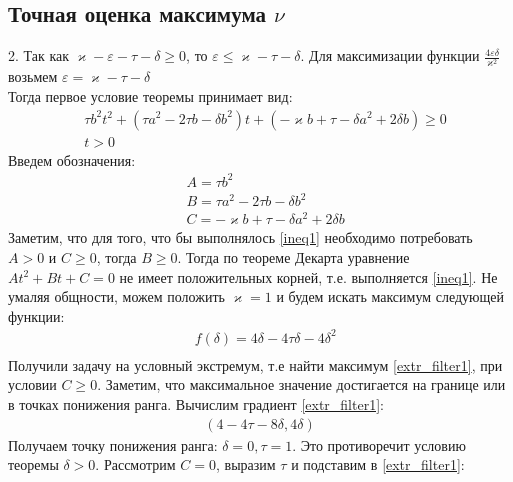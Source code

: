 \documentclass[a4paper]{article}
\begin{document}
\subsection{Точная оценка максимума $\nu$}
2. Так как $\varkappa - \varepsilon - \tau - \delta \geq 0$, то $ \varepsilon \leq \varkappa - \tau - \delta$. Для максимизации функции $\frac{4\varepsilon\delta}{\varkappa^2}$ возьмем $\varepsilon = \varkappa - \tau - \delta$\\
Тогда первое условие теоремы принимает вид:
\begin{equation}\label{ineq1} 
 \begin{aligned}
&\tau b^2t^2 + (\tau a^2-2 \tau b - \delta b^2)t + (-\varkappa b+\tau-\delta a^2 + 2\delta b) \geq 0\\
&t > 0
 \end{aligned}
\end{equation}
Введем обозначения:
\begin{equation}
 \begin{aligned}
&A = \tau b^2\\
&B = \tau a^2-2 \tau b - \delta b^2\\
&C = -\varkappa b+\tau-\delta a^2 + 2\delta b
 \end{aligned}
\end{equation}
Заметим, что для того, что бы выполнялось \eqref{ineq1} необходимо потребовать $A > 0$ и $C \geq 0$, тогда $B \geq 0$. Тогда по теореме Декарта уравнение $At^2 + Bt + C = 0$ не имеет положительных корней, т.е. выполняется \eqref{ineq1}. Не умаляя общности, можем положить $\varkappa = 1$ и будем искать максимум следующей функции: 
\begin{equation}\label{extr_filter1}
 \begin{aligned}
&f(\delta) = 4\delta-4\tau\delta - 4\delta^2\\
 \end{aligned}
\end{equation} 
Получили задачу на условный экстремум, т.е найти максимум \eqref{extr_filter1}, при условии $C \geq 0$.  Заметим, что максимальное значение достигается на границе или в точках понижения ранга. Вычислим градиент \eqref{extr_filter1}:
\begin{equation}
 \begin{aligned}
(4 - 4\tau - 8\delta, 4\delta)
 \end{aligned}
\end{equation} 
Получаем точку понижения ранга: $\delta = 0, \tau = 1$. Это противоречит условию теоремы $\delta > 0$. Рассмотрим $C = 0$, выразим $\tau$ и подставим в \eqref{extr_filter1}:
\end{document}
